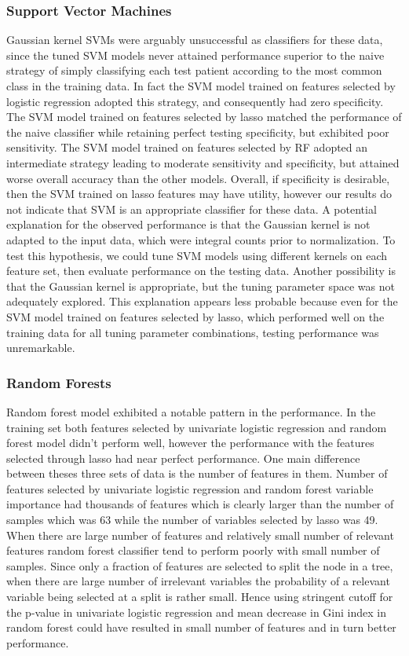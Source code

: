 \documentclass[a4paper]{article}
\begin{document}
\subsubsection{Support Vector Machines}
Gaussian kernel SVMs were arguably unsuccessful as classifiers for these data, since the tuned SVM models never attained performance superior to the naive strategy of simply classifying each test patient according to the most common class in the training data. In fact the SVM model trained on features selected by logistic regression adopted this strategy, and consequently had zero specificity. The SVM model trained on features selected by lasso matched the performance of the naive classifier while retaining perfect testing specificity, but exhibited poor sensitivity. The SVM model trained on features selected by RF adopted an intermediate strategy leading to moderate sensitivity and specificity, but attained worse overall accuracy than the other models. Overall, if specificity is desirable, then the SVM trained on lasso features may have utility, however our results do not indicate that SVM is an appropriate classifier for these data. A potential explanation for the observed performance is that the Gaussian kernel is not adapted to the input data, which were integral counts prior to normalization. To test this hypothesis, we could tune SVM models using different kernels on each feature set, then evaluate performance on the testing data. Another possibility is that the Gaussian kernel is appropriate, but the tuning parameter space was not adequately explored. This explanation appears less probable because even for the SVM model trained on features selected by lasso, which performed well on the training data for all tuning parameter combinations, testing performance was unremarkable. 

\subsubsection{Random Forests}
Random forest model exhibited a notable pattern in the performance. In the training set both features selected by univariate logistic regression and random forest model didn't perform well, however the performance with the features selected through lasso had near perfect performance. One main difference between theses three sets of data is the number of features in them. Number of features selected by univariate logistic regression and random forest variable importance had thousands of features which is clearly larger than the number of samples which was 63 while the number of variables selected by lasso was 49. When there are large number of features and relatively small number of relevant features random forest classifier tend to perform poorly with small number of samples. Since only a fraction of features are selected to split the node in a tree, when there are large number of irrelevant variables the probability of a relevant variable being selected at a split is rather small. Hence using stringent cutoff for the p-value in univariate logistic regression and mean decrease in Gini index in random forest could have resulted in small number of features and in turn better performance.   
\end{document}
